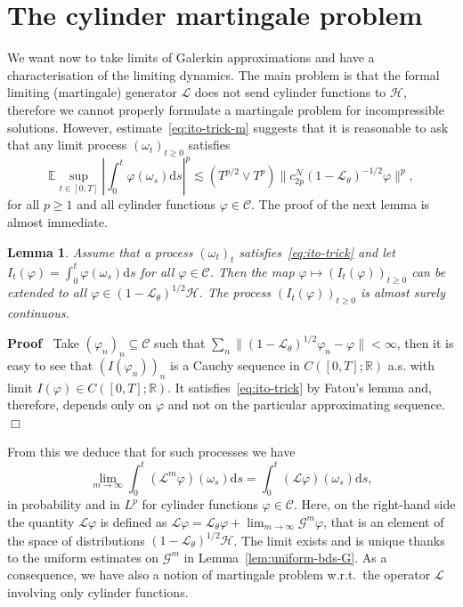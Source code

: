\documentclass{article}
\newcommand{\mathd}{\mathrm{d}}
\newenvironment{proof}{\noindent\textbf{Proof\ }}{\hspace*{\fill}$\Box$\medskip}
\newtheorem{lemma}{Lemma}
\begin{document}
\section{The cylinder martingale problem}\label{sec:cyl-mart}

We want now to take limits of Galerkin approximations and have a
characterisation of the limiting dynamics. The main problem is that the formal
limiting (martingale) generator $\mathcal{L}$ does not send cylinder functions
to $\mathcal{H}$, therefore we cannot properly formulate a martingale problem
for incompressible solutions. However, estimate~{\eqref{eq:ito-trick-m}}
suggests that it is reasonable to ask that any limit process $(\omega_t)_{t
\geqslant 0}$ satisfies
\begin{equation}
  \mathbb{E} \sup_{t \in [0, T]} \left| \int_0^t \varphi (\omega_s) \mathd s
  \right|^p \lesssim (T^{p / 2} \vee T^p) \| c_{2 p}^{\mathcal{N}} (1
  -\mathcal{L}_{\theta})^{- 1 / 2} \varphi \|^p, \label{eq:ito-trick}
\end{equation}
for all $p \geqslant 1$ and all cylinder functions $\varphi \in \mathcal{C}$.
The proof of the next lemma is almost immediate.

\begin{lemma}
  \label{lemma:integral}Assume that a process $(\omega_t)_t$
  satisfies~{\eqref{eq:ito-trick}} and let $I_t (\varphi) = \int_0^t \varphi
  (\omega_s) \mathd s$ for all $\varphi \in \mathcal{C}$. Then the map
  $\varphi \mapsto (I_t (\varphi))_{t \geqslant 0}$ can be extended to all
  $\varphi \in (1 -\mathcal{L}_{\theta})^{1 / 2} \mathcal{H}$. The process
  $(I_t (\varphi))_{t \geqslant 0}$ is almost surely continuous.
\end{lemma}

\begin{proof}
  Take $(\varphi_n)_n \subseteq \mathcal{C}$ such that $\sum_n \| (1
  -\mathcal{L}_{\theta})^{1 / 2} \varphi_n - \varphi \| < \infty$, then it is
  easy to see that $(I (\varphi_n))_n$ is a Cauchy sequence in $C ([0, T] ;
  \mathbb{R})$ a.s. with limit $I (\varphi) \in C ([0, T] ; \mathbb{R})$. It
  satisfies~{\eqref{eq:ito-trick}} by Fatou's lemma and, therefore, depends
  only on $\varphi$ and not on the particular approximating sequence.
\end{proof}

From this we deduce that for such processes we have
\[ \lim_{m \rightarrow \infty} \int_0^t (\mathcal{L}^m \varphi) (\omega_s)
   \mathd s = \int_0^t (\mathcal{L} \varphi) (\omega_s) \mathd s, \]
in probability and in $L^p$ for cylinder functions $\varphi \in \mathcal{C}$.
Here, on the right-hand side the quantity $\mathcal{L} \varphi$ is defined as
$\mathcal{L} \varphi =\mathcal{L}_{\theta} \varphi + \lim_{m \rightarrow
\infty} \mathcal{G}^m \varphi$, that is an element of the space of
distributions $(1 -\mathcal{L}_{\theta})^{1 / 2} \mathcal{H}$. The limit
exists and is unique thanks to the uniform estimates on $\mathcal{G}^m$ in
Lemma~\ref{lem:uniform-bds-G}. As a consequence, we have also a notion of
martingale problem w.r.t.~the operator $\mathcal{L}$ involving only cylinder
functions.
\end{document}
